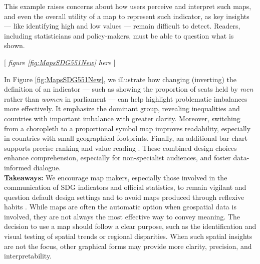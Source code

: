 \documentclass[11pt,twoside,a4paper]{article}
\begin{document}
This example raises concerns about how users perceive and interpret such maps, and even the overall utility of a map to represent such indicator, as key insights — like identifying high and low values — remain difficult to detect. Readers, including statisticians and policy-makers, must be able to question what is shown.

\begin{center}
    [ \textit{figure \ref{fig:MapsSDG551New}  here}  ]
\end{center}


In Figure \ref{fig:MapsSDG551New}, we illustrate how changing (inverting) the definition of an indicator — such as showing the proportion of seats held by \textit{men} rather than \textit{women} in parliament — can help highlight problematic imbalances more effectively. It emphasize the dominant group, revealing inequalities and countries with important imbalance with greater clarity. Moreover, switching from a choropleth to a proportional symbol map improves readability, especially in countries with small geographical footprints. Finally, an additional bar chart supports precise ranking and value reading \citep{Munzner2014}. These combined design choices enhance comprehension, especially for non-specialist audiences, and foster data-informed dialogue.\\ 


\noindent \textbf{ Takeaways:} We encourage map makers, especially those involved in the communication of SDG indicators and official statistics, to remain vigilant and question default design settings and to avoid maps produced through reflexive habits \citep{kraak2018SDG}. While maps are often the automatic option when geospatial data is involved, they are not always the most effective way to convey meaning. The decision to use a map should follow a clear purpose, such as the identification and visual testing of spatial trends or regional disparities. When such spatial insights are not the focus, other graphical forms may provide more clarity, precision, and interpretability. 
\end{document}
